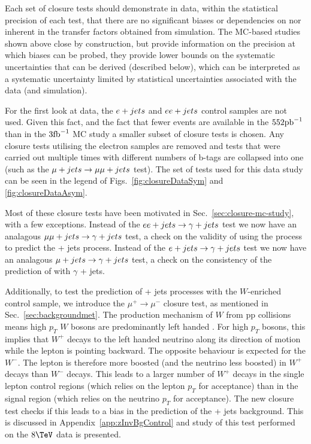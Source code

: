 Each set of closure tests should demonstrate in data, within the
statistical precision of each test, that there are no significant
biases or dependencies on \njet nor \scalht inherent in the transfer
factors obtained from simulation. The MC-based studies shown above
close by construction, but provide information on the precision at
which biases can be probed, \ie they provide lower bounds on the
systematic uncertainties that can be derived (described below), which
can be interpreted as a systematic uncertainty limited by statistical
uncertainties associated with the data (and simulation).

For the first look at data, the $\ej$ and $\eej$ control samples are
not used. Given this fact, and the fact that fewer events are
available in the $552\ipb$ than in the $3\ifb$ MC study a smaller
subset of closure tests is chosen. Any closure tests utilising the
electron samples are removed and tests that were carried out
multiple times with different numbers of b-tags are collapsed into one
(such as the $\mj\rightarrow\mmj$ test). The set of tests used for
this data study can be seen in the legend of
Figs.~\ref{fig:closureDataSym} and \ref{fig:closureDataAsym}. 

Most of these closure tests have been motivated in
Sec.~\ref{sec:closure-mc-study}, with a few exceptions. Instead of the
$\eej\rightarrow\gj$ test we now have an analagous
$\mmj\rightarrow\gj$ test, a check on the validity of using the \gj
process to predict the \znunu + jets process. Instead of the 
$\ej\rightarrow\gj$ test we now have an analagous
$\mj\rightarrow\gj$ test, a check on 
the consistency of the prediction of \wej with $\gamma$ + jets.

Additionally, to test the prediction of \znunu + jets processes with
the $W$-enriched \mj control sample, we introduce the
$\mu^{+}\rightarrow\mu^{-}$ closure test, as mentioned in
Sec.~\ref{sec:backgroundmet}. The production mechanism of $W$ from pp collisions means
high $p_T$ $W$ bosons are predominantly left handed \cite{WPol}.  
For high $p_T$ bosons, this implies that $W^+$ decays 
to the left handed neutrino along its direction of motion while 
the lepton is pointing backward. The opposite behaviour is
expected for the $W^-$. The lepton is therefore more boosted (and
the neutrino less boosted) in $W^+$ decays than $W^-$ decays.  This
leads to a larger number of $W^+$ decays in the single lepton control
regions (which relies on the lepton $p_T$ for acceptance) than in the
signal region (which relies on the neutrino $p_T$ for acceptance). The
new closure test checks if this leads to a bias in the prediction of the 
\znunu + jets background. This is discussed in
Appendix~\ref{app:zInvBgControl} and study of this test performed on the
$8\tev$ data is presented.

